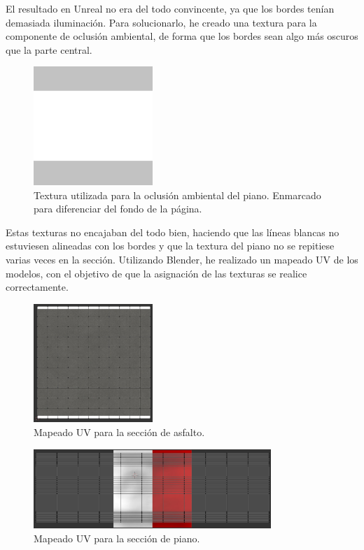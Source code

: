 El resultado en Unreal no era del todo convincente, ya que los bordes tenían demasiada iluminación. Para solucionarlo, he creado una textura para la componente de oclusión ambiental, de forma que los bordes sean algo más oscuros que la parte central. 

\begin{figure}[H]
    \centering
    \includegraphics[width=0.4\textwidth,cframe=black 0.5pt 0pt]{imagenes/converted/pista/kerb-dirty2-AO.jpg}
    \caption{Textura utilizada para la oclusión ambiental del piano. Enmarcado para diferenciar del fondo de la página.}
    \label{fig:pianoao}
\end{figure}

Estas texturas no encajaban del todo bien, haciendo que las líneas blancas no estuviesen alineadas con los bordes y que la textura del piano no se repitiese varias veces en la sección. Utilizando Blender, he realizado un mapeado UV de los modelos, con el objetivo de que la asignación de las texturas se realice correctamente.

\begin{figure}[H]
    \centering
    \includegraphics[width=0.4\textwidth]{imagenes/converted/pista/uv-straight.jpg}
    \caption{Mapeado UV para la sección de asfalto.}
    \label{fig:uvasphalt}
\end{figure}

\begin{figure}[H]
    \centering
    \includegraphics[width=0.8\textwidth]{imagenes/converted/pista/uv-kerb.jpg}
    \caption{Mapeado UV para la sección de piano.}
    \label{fig:uvkerb}
\end{figure}

